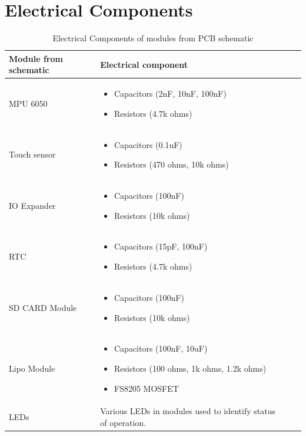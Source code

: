 \documentclass[12pt, titlepage]{article}
\begin{document}
\section{Electrical Components}
\begin{table}[H]
	\begin{tabularx}{1.05\textwidth} { 
		  | >{\centering\arraybackslash}X 
		  | >{\centering\arraybackslash}X 
		  | >{\centering\arraybackslash}X 
		  | >{\centering\arraybackslash}X | }
		 \hline
		 \textbf{Module from schematic} & \textbf{Electrical component}\\
		\hline
		 MPU 6050  & \begin{itemize}
						\item{Capacitors (2nF, 10nF, 100nF)}
						\item{Resistors (4.7k ohms)}
					\end{itemize}\\
		\hline
		 Touch sensor  & \begin{itemize}
						\item{Capacitors (0.1uF)}
						\item{Resistors (470 ohms, 10k ohms)}
					\end{itemize}\\
		 \hline
		 IO Expander   & \begin{itemize}
						\item{Capacitors (100nF)}
						\item{Resistors (10k ohms)}
					\end{itemize}\\
		 \hline
		 RTC  & \begin{itemize}
						\item{Capacitors (15pF, 100nF)}
						\item{Resistors (4.7k ohms)}
					\end{itemize}\\
		 \hline
		 SD CARD Module   & \begin{itemize}
						\item{Capacitors (100nF)}
						\item{Resistors (10k ohms)}
					\end{itemize}\\
		 \hline
		 Lipo Module  & \begin{itemize}
						\item{Capacitors (100nF, 10uF)}
						\item{Resistors (100 ohms, 1k ohms, 1.2k ohms)}
						\item{FS8205 MOSFET}
					\end{itemize}\\
		 \hline
		 LEDs  & Various LEDs in modules used to identify status of operation.\\
		 \hline
	\end{tabularx}
\caption{\label{DesignElectrical}Electrical Components of modules from PCB schematic}  
\end{table}
\end{document}

